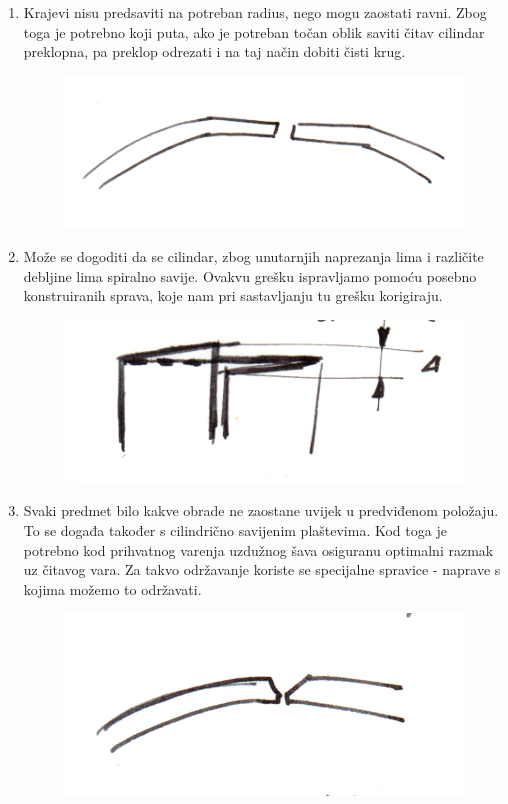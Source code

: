 \documentclass[a4paper,12pt]{article}
\numberwithin{figure}{section}
\begin{document}
\begin{enumerate}
\item Krajevi nisu predsaviti na potreban radius, nego mogu zaostati ravni. Zbog toga je potrebno koji puta, ako je potreban točan oblik saviti čitav cilindar preklopna, pa preklop odrezati i na taj način dobiti čisti krug.
\begin{figure}[!h]
\centering
\includegraphics[scale=0.1]{image_52-1.png}
\end{figure}
\FloatBarrier
\item Može se dogoditi da se cilindar, zbog unutarnjih naprezanja lima i različite debljine lima spiralno savije. Ovakvu grešku ispravljamo pomoću posebno konstruiranih sprava, koje nam pri sastavljanju tu grešku korigiraju.
\begin{figure}[!h]
\centering
\includegraphics[scale=0.1]{image_52-2.png}
\end{figure}
\FloatBarrier
\item Svaki predmet bilo kakve obrade ne zaostane uvijek u predviđenom položaju. To se događa također s cilindrično savijenim plaštevima. Kod toga je potrebno kod prihvatnog varenja uzdužnog šava osiguranu optimalni razmak uz čitavog vara. Za takvo održavanje koriste se specijalne spravice - naprave s kojima možemo to  održavati.
\begin{figure}[!h]
\centering
\includegraphics[scale=0.1]{image_52-3.png}
\end{figure}
\FloatBarrier
\end{enumerate}
\clearpage
\end{document}
